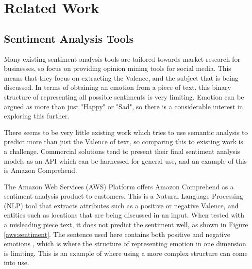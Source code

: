 
\section{Related Work}
\subsection{Sentiment Analysis Tools}

Many existing sentiment analysis tools are tailored towards market research for businesses, so focus on providing opinion mining tools for social media. This means that they focus on extracting the Valence, and the subject that is being discussed. In terms of obtaining an emotion from a piece of text, this binary structure of representing all possible sentiments is very limiting. Emotion can be argued as more than just "Happy" or "Sad", so there is a considerable interest in exploring this further.

There seems to be very little existing work which tries to use semantic analysis to predict more than just the Valence of text, so comparing this to existing work is a challenge. Commercial solutions tend to present their final sentiment analysis models as an API which can be harnessed for general use, and an example of this is Amazon Comprehend.

The Amazon Web Services (AWS) Platform offers Amazon Comprehend \cite{aws} as a sentiment analysis product to customers. This is a Natural Language Processing (NLP) tool that extracts attributes such as a positive or negative Valence, and entities such as locations that are being discussed in an input. When tested with a misleading piece text, it does not predict the sentiment well, as shown in Figure \ref{aws:sentiment}. The sentence used here contains both positive and negative emotions , which is where the structure of representing emotion in one dimension is limiting. This is an example of where using a more complex structure can come into use. 

